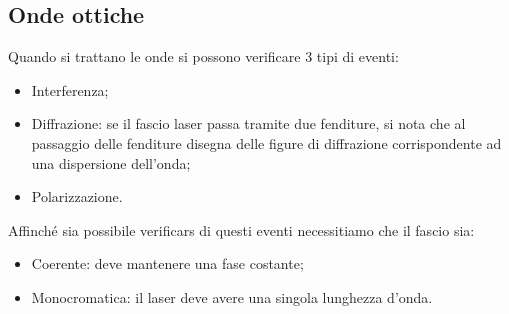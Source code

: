 \documentclass{article}
\begin{document}
\subsection{Onde ottiche}
Quando si trattano le onde si possono verificare 3 tipi di eventi:\begin{itemize}
    \item Interferenza;
    \item Diffrazione: se il fascio laser passa tramite due fenditure, si nota che al passaggio delle fenditure disegna delle figure di diffrazione corrispondente ad una dispersione dell'onda;
    \item Polarizzazione.
\end{itemize}
Affinché sia possibile verificars di questi eventi necessitiamo che il fascio sia:\begin{itemize}
    \item Coerente: deve mantenere una fase costante;
    \item Monocromatica: il laser deve avere una singola lunghezza d'onda.
\end{itemize}
\end{document}
